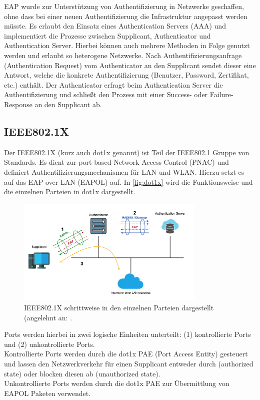 \documentclass[conference]{IEEEtran}
\begin{document}
EAP wurde zur Unterstützung von Authentifizierung in Netzwerke geschaffen, ohne dass  bei einer neuen Authentifizierung die Infrastruktur angepasst werden müsste. Es erlaubt den Einsatz eines Authentication Servers (AAA) und implementiert die Prozesse zwischen Supplicant, Authenticator und Authentication Server. Hierbei können auch mehrere Methoden in Folge genutzt werden und erlaubt so heterogene Netzwerke. Nach Authentifizierungsanfrage (Authentication Request) vom Authenticator an den Supplicant sendet dieser eine Antwort, welche die konkrete Authentifizierung (Benutzer, Password, Zertifikat, etc.) enthält. Der Authenticator erfragt beim Authentication Server die Authentifizierung und schließt den Prozess mit einer Success- oder Failure-Response an den Supplicant ab.

\subsection{IEEE802.1X}
Der IEEE802.1X (kurz auch dot1x genannt) ist Teil der IEEE802.1 Gruppe von Standards. Es dient zur port-based Network Access Control (PNAC) und definiert Authentifizierungsmechanismen für LAN und WLAN. Hierzu setzt es auf das EAP over LAN (EAPOL) auf. In \autoref{fig:dot1x} wird die Funktionsweise und die einzelnen Parteien in dot1x dargestellt.\\

\begin{figure}[hbt]
	\centering
	\includegraphics[width=9cm]{figures/dot1x}
	\caption{IEEE802.1X schrittweise in den einzelnen Parteien dargestellt (angelehnt an: \cite{eap}.}
	\label{fig:dot1x}
\end{figure}

Ports werden hierbei in zwei logische Einheiten unterteilt: (1) kontrollierte Ports und (2) unkontrollierte Ports.\\
Kontrollierte Ports werden durch die dot1x PAE (Port Access Entity) gesteuert und lassen den Netzwerkverkehr für einen Supplicant entweder durch (authorized state) oder blocken diesen ab (unauthorized state).\\
Unkontrollierte Ports werden durch die dot1x PAE zur Übermittlung von EAPOL Paketen verwendet.
\end{document}

